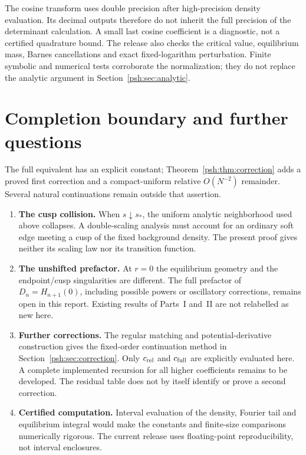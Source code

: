 \documentclass[11pt,a4paper]{article}
\numberwithin{equation}{section}
\theoremstyle{remark}\newtheorem{remark}[theorem]{Remark}
\begin{document}
The cosine transform uses double precision after high-precision density
evaluation. Its decimal outputs therefore do not inherit the full
precision of the determinant calculation. A small last cosine
coefficient is a diagnostic, not a certified quadrature bound.
The release also checks the critical value, equilibrium mass,
Barnes cancellations and exact fixed-logarithm perturbation. Finite
symbolic and numerical tests corroborate the normalization; they do not
replace the analytic argument in Section~\ref{psh:sec:analytic}.

\section{Completion boundary and further questions}\label{psh:sec:open}
The full equivalent has an explicit constant; Theorem~\ref{psh:thm:correction}
adds a proved first correction and a compact-uniform relative
$O(N^{-2})$ remainder. Several natural continuations
remain outside that assertion.
\begin{enumerate}
\item \textbf{The cusp collision.} When $s\downarrow s_*$, the uniform
analytic neighborhood used above collapses. A double-scaling analysis
must account for an ordinary soft edge meeting a cusp of the fixed
background density. The present proof gives neither its scaling law
nor its transition function.
\item \textbf{The unshifted prefactor.} At $r=0$ the equilibrium geometry
and the endpoint/cusp singularities are different. The full prefactor of
$D_n=H_{n+1}(0)$, including possible powers or oscillatory corrections,
remains open in this report. Existing results of Parts~I and~II are not
relabelled as new here.
\item \textbf{Further corrections.} The regular matching and potential-derivative
construction gives the fixed-order continuation method in
Section~\ref{psh:sec:correction}. Only $c_{\rm rel}$ and $c_{\rm full}$ are
explicitly evaluated here. A complete implemented recursion for all
higher coefficients remains to be developed. The residual table does
not by itself identify or prove a second correction.
\item \textbf{Certified computation.} Interval evaluation of the density,
Fourier tail and equilibrium integral would make the constants and
finite-size comparisons numerically rigorous. The current release uses
floating-point reproducibility, not interval enclosures.
\end{enumerate}
\end{document}
